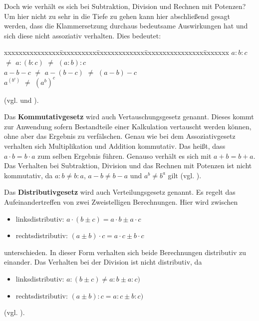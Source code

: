 \documentclass[12pt,a4paper]{article}
\theoremstyle{definition}
\begin{document}
Doch wie verhält es sich bei Subtraktion, Division und Rechnen mit Potenzen?
Um hier nicht zu sehr in die Tiefe zu gehen kann hier abschließend gesagt werden, dass die Klammersetzung durchaus bedeutsame Auswirkungen hat und sich diese nicht assoziativ verhalten.
Dies bedeutet:
\begin{tabbing}
xxxxxxxxxxxxxxx\=xxxxxxxxxx\=xxxxxxxxxxxxx\=xxxxxxxxxxxxxxxx\=xxxxxxx\kill
\> $a : b : c$ \> $\neq$ $a : ( b : c)$ \> $\neq$ $(a : b) : c$ \\
\> $a - b - c$ \> $\neq$ $a - ( b - c)$ \> $\neq$ $(a - b) - c$ \\
\> $a^(b^c)$   \> $\neq$ $(a^b)^c$
\end{tabbing}
(vgl. \cite[5--7]{Adler2013} und \cite{AssociativityEncyclopediaofMathematics2016}).

\newpage
Das \textbf{Kommutativgesetz} wird auch Vertauschungsgesetz genannt.
Dieses kommt zur Anwendung sofern Bestandteile einer Kalkulation vertauscht werden können, ohne aber das Ergebnis zu verfälschen.\newline
Genau wie bei dem Assoziativgesetz verhalten sich Multiplikation und Addition kommutativ.
Das heißt, dass $a \cdot b = b \cdot a$ zum selben Ergebnis führen.
Genauso verhält es sich mit $a + b = b + a$.\newline
Das Verhalten bei Subtraktion, Division und das Rechnen mit Potenzen ist nicht kommutativ, da $a : b \neq b : a$, $a - b \neq b - a$ und $a^b \neq b^a$ gilt (vgl. \cite{EncyclopediaofMathematics2014}).

Das \textbf{Distributivgesetz} wird auch Verteilungsgesetz genannt.
Es regelt das Aufeinandertreffen von zwei Zweistelligen Berechnungen.
Hier wird zwischen
\begin{itemize}
    \item linksdistributiv: $a \cdot (b \pm c) = a \cdot b \pm a \cdot c$
    \item rechtsdistributiv: $(a \pm b) \cdot c = a \cdot c \pm b\cdot c$
\end{itemize}
unterschieden.
In dieser Form verhalten sich beide Berechnungen distributiv zu einander.\newline
Das Verhalten bei der Division ist nicht distributiv, da
\begin{itemize}
    \item linksdistributiv: $a : (b \pm c) \neq a :b \pm a : c)$
    \item rechtsdistributiv: $(a \pm b) : c = a :c \pm b : c)$
\end{itemize}
(vgl. \cite{EncyclopediaofMathematics2016}).
\end{document}
